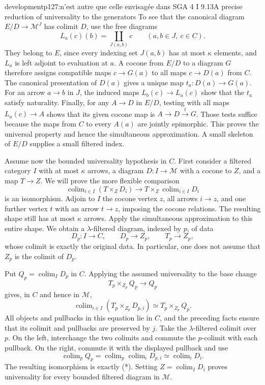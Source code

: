 \begin{dcomment}{development}{p127:n'est autre que celle envisagée dans SGA 4 I 9.13}{A precise reduction of universality to the generators}
To see that the canonical diagram $E/D\to\mathcal M^J$ has colimit $D$, use the free diagrams
\[
 L_a(c)(b)=\coprod_{J(a,b)}c
 \qquad(a,b\in J,\ c\in C).
\]
They belong to $E$, since every indexing set $J(a,b)$ has at most $\kappa$ elements, and $L_a$ is left adjoint to evaluation at $a$. A cocone from $E/D$ to a diagram $G$ therefore assigns compatible maps $c\to G(a)$ to all maps $c\to D(a)$ from $C$. The canonical presentation of $D(a)$ gives a unique map $t_a:D(a)\to G(a)$. For an arrow $a\to b$ in $J$, the induced maps $L_b(c)\to L_a(c)$ show that the $t_a$ satisfy naturality. Finally, for any $A\to D$ in $E/D$, testing with all maps $L_a(c)\to A$ shows that its given cocone map is $A\to D\xrightarrow{t}G$. Those tests suffice because the maps from $C$ to every $A(a)$ are jointly epimorphic. This proves the universal property and hence the simultaneous approximation. A small skeleton of $E/D$ supplies a small filtered index.

Assume now the bounded universality hypothesis in $C$. First consider a filtered category $I$ with at most $\kappa$ arrows, a diagram $D:I\to\mathcal M$ with a cocone to $Z$, and a map $T\to Z$. We will prove the more flexible comparison
\[
 \operatorname{colim}_{i\in I}(T\times_Z D_i)
   \longrightarrow T\times_Z\operatorname{colim}_{i\in I}D_i
 \tag{*}
\]
is an isomorphism. Adjoin to $I$ the cocone vertex $z$, all arrows $i\to z$, and one further vertex $t$ with an arrow $t\to z$, imposing the cocone relations. The resulting shape still has at most $\kappa$ arrows. Apply the simultaneous approximation to this entire shape. We obtain a $\lambda$-filtered diagram, indexed by $p$, of data
\[
 D_p:I\to C,\qquad D_p\longrightarrow Z_p,
 \qquad T_p\longrightarrow Z_p,
\]
whose colimit is exactly the original data. In particular, one does not assume that $Z_p$ is the colimit of $D_p$.

Put $Q_p=\operatorname{colim}_I D_p$ in $C$. Applying the assumed universality to the base change
\[
 T_p\times_{Z_p}Q_p\longrightarrow Q_p
\]
gives, in $C$ and hence in $\mathcal M$,
\[
 \operatorname{colim}_{i\in I}(T_p\times_{Z_p}D_{p,i})
   \simeq T_p\times_{Z_p}Q_p.
\]
All objects and pullbacks in this equation lie in $C$, and the preceding facts ensure that its colimit and pullbacks are preserved by $j$. Take the $\lambda$-filtered colimit over $p$. On the left, interchange the two colimits and commute the $p$-colimit with each pullback. On the right, commute it with the displayed pullback and use
\[
 \operatorname{colim}_p Q_p
   =\operatorname{colim}_p\operatorname{colim}_i D_{p,i}
   \simeq\operatorname{colim}_i D_i.
\]
The resulting isomorphism is exactly (*). Setting $Z=\operatorname{colim}_I D_i$ proves universality for every bounded filtered diagram in $\mathcal M$.


\end{dcomment}
